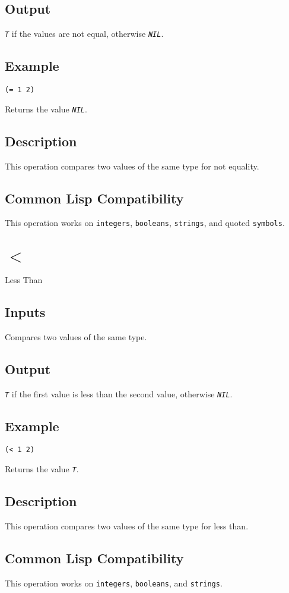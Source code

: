 \documentclass[10pt, openany]{book}
\newcommand{\constant}[1]{\emph{\texttt{#1}}}
\newcommand{\datatype}[1]{\texttt{#1}}
\begin{document}
\subsection{Output}
\constant{T} if the values are not equal, otherwise \constant{NIL}.
\subsection{Example}
\begin{lstlisting}
(= 1 2)
\end{lstlisting}
Returns the value \constant{NIL}.
\subsection{Description}
This operation compares two values of the same type for not equality.
\subsection{Common Lisp Compatibility}
This operation works on \datatype{integers}, \datatype{booleans}, \datatype{strings}, and quoted \datatype{symbols}.

\section{$<$}
Less Than
\subsection{Inputs}
Compares two values of the same type.
\subsection{Output}
\constant{T} if the first value is less than the second value, otherwise \constant{NIL}.
\subsection{Example}
\begin{lstlisting}
(< 1 2)
\end{lstlisting}
Returns the value \constant{T}.
\subsection{Description}
This operation compares two values of the same type for less than.
\subsection{Common Lisp Compatibility}
This operation works on \datatype{integers}, \datatype{booleans}, and \datatype{strings}.
\end{document}
